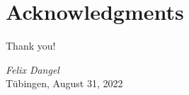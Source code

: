 
\chapter{Acknowledgments}


\lipsum[66]

\lipsum[66]

\lipsum[66]

\lipsum[66]
\lipsum[66]
\lipsum[66]


\lipsum[66]

\lipsum[66]

\lipsum[66]

\lipsum[66]

Thank you!

\begin{flushright}
  \textit{Felix Dangel}\\
  T\"ubingen, August 31, 2022
\end{flushright}

